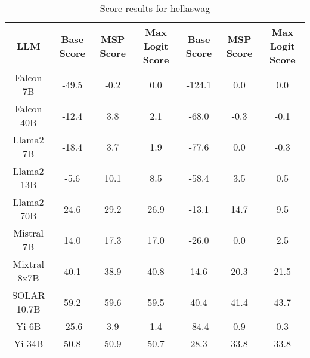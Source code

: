 \renewcommand\arraystretch{1.2}
\begin{table*}
\centering
\begin{tabular}{c|c|c|c|c|c|c}
LLM & Base Score & MSP Score & Max Logit Score & Base Score & MSP Score & Max Logit Score\\ \hline
Falcon 7B & -49.5 & -0.2 & 0.0 & -124.1 & 0.0 & 0.0\\
Falcon 40B & -12.4 & 3.8 & 2.1 & -68.0 & -0.3 & -0.1\\
Llama2 7B & -18.4 & 3.7 & 1.9 & -77.6 & 0.0 & -0.3\\
Llama2 13B & -5.6 & 10.1 & 8.5 & -58.4 & 3.5 & 0.5\\
Llama2 70B & 24.6 & 29.2 & 26.9 & -13.1 & 14.7 & 9.5\\
Mistral 7B & 14.0 & 17.3 & 17.0 & -26.0 & 0.0 & 2.5\\
Mixtral 8x7B & 40.1 & 38.9 & 40.8 & 14.6 & 20.3 & 21.5\\
SOLAR 10.7B & 59.2 & 59.6 & 59.5 & 40.4 & 41.4 & 43.7\\
Yi 6B & -25.6 & 3.9 & 1.4 & -84.4 & 0.9 & 0.3\\
Yi 34B & 50.8 & 50.9 & 50.7 & 28.3 & 33.8 & 33.8\\
\hline
\end{tabular}
\caption{Score results for hellaswag}
\end{table*}
\label{tab:hellaswag_score}
